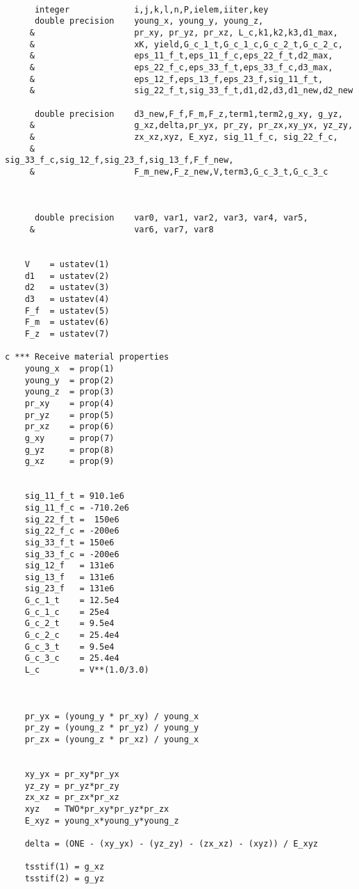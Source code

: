 \begin{lstlisting}
      
      integer             i,j,k,l,n,P,ielem,iiter,key
      double precision    young_x, young_y, young_z,  
     &                    pr_xy, pr_yz, pr_xz, L_c,k1,k2,k3,d1_max,
     &                    xK, yield,G_c_1_t,G_c_1_c,G_c_2_t,G_c_2_c,
     &                    eps_11_f_t,eps_11_f_c,eps_22_f_t,d2_max,
     &                    eps_22_f_c,eps_33_f_t,eps_33_f_c,d3_max,
     &                    eps_12_f,eps_13_f,eps_23_f,sig_11_f_t,
     &                    sig_22_f_t,sig_33_f_t,d1,d2,d3,d1_new,d2_new
      
      double precision    d3_new,F_f,F_m,F_z,term1,term2,g_xy, g_yz, 
     &                    g_xz,delta,pr_yx, pr_zy, pr_zx,xy_yx, yz_zy,
     &                    zx_xz,xyz, E_xyz, sig_11_f_c, sig_22_f_c,
     &                    sig_33_f_c,sig_12_f,sig_23_f,sig_13_f,F_f_new,
     &                    F_m_new,F_z_new,V,term3,G_c_3_t,G_c_3_c

      
      
      double precision    var0, var1, var2, var3, var4, var5,
     &                    var6, var7, var8
	

    V    = ustatev(1)
    d1   = ustatev(2)
    d2   = ustatev(3)
    d3   = ustatev(4)
    F_f  = ustatev(5)
    F_m  = ustatev(6)
    F_z  = ustatev(7) 
      
c *** Receive material properties
	young_x  = prop(1)
	young_y  = prop(2)
	young_z  = prop(3)
	pr_xy    = prop(4)
	pr_yz    = prop(5)
	pr_xz    = prop(6)
	g_xy     = prop(7)
	g_yz     = prop(8)
	g_xz     = prop(9)
      
      
    sig_11_f_t = 910.1e6
    sig_11_f_c = -710.2e6
    sig_22_f_t =  150e6 
    sig_22_f_c = -200e6
    sig_33_f_t = 150e6
    sig_33_f_c = -200e6
    sig_12_f   = 131e6
    sig_13_f   = 131e6
    sig_23_f   = 131e6
    G_c_1_t    = 12.5e4
    G_c_1_c    = 25e4
    G_c_2_t    = 9.5e4
    G_c_2_c    = 25.4e4
    G_c_3_t    = 9.5e4
    G_c_3_c    = 25.4e4
    L_c        = V**(1.0/3.0)
    
   
      
	pr_yx = (young_y * pr_xy) / young_x
	pr_zy = (young_z * pr_yz) / young_y
	pr_zx = (young_z * pr_xz) / young_x
	
	
	xy_yx = pr_xy*pr_yx
	yz_zy = pr_yz*pr_zy 
	zx_xz = pr_zx*pr_xz
	xyz   = TWO*pr_xy*pr_yz*pr_zx
	E_xyz = young_x*young_y*young_z
	
	delta = (ONE - (xy_yx) - (yz_zy) - (zx_xz) - (xyz)) / E_xyz

    tsstif(1) = g_xz
    tsstif(2) = g_yz      


\end{lstlisting}
